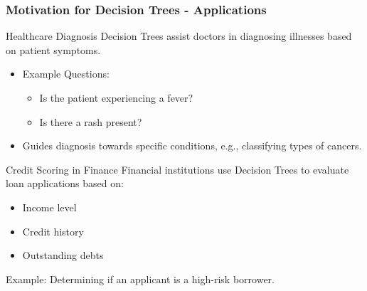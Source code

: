 \documentclass[aspectratio=169]{beamer}
\begin{document}
\begin{frame}[fragile]
    \frametitle{Motivation for Decision Trees - Applications}
    \begin{block}{Healthcare Diagnosis}
        Decision Trees assist doctors in diagnosing illnesses based on patient symptoms.
        \begin{itemize}
            \item Example Questions:
            \begin{itemize}
                \item Is the patient experiencing a fever?
                \item Is there a rash present?
            \end{itemize}
            \item Guides diagnosis towards specific conditions, e.g., classifying types of cancers.
        \end{itemize}
    \end{block}
    
    \begin{block}{Credit Scoring in Finance}
        Financial institutions use Decision Trees to evaluate loan applications based on:
        \begin{itemize}
            \item Income level
            \item Credit history
            \item Outstanding debts
        \end{itemize}
        Example: Determining if an applicant is a high-risk borrower.
    \end{block}
\end{frame}
\end{document}
